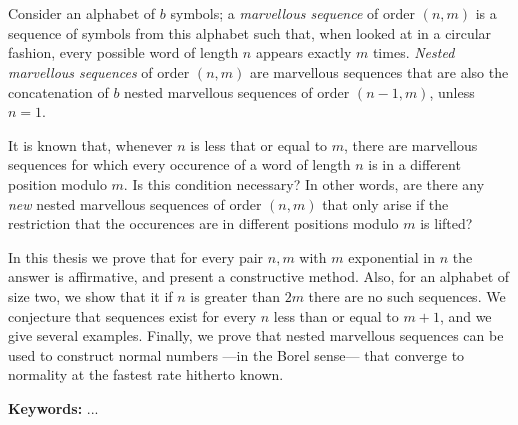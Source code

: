 \chapter*{\runtitle}

Consider an alphabet of $b$ symbols; a \emph{marvellous sequence} of
order $(n,m)$ is a sequence of symbols from this alphabet such that,
when looked at in a circular fashion, every possible word of length $n$ appears
exactly $m$ times.
\emph{Nested marvellous sequences} of order $(n,m)$ are marvellous
sequences that are also the concatenation of $b$ nested
marvellous sequences of order $(n-1,m)$, unless $n = 1$.

It is known that, whenever $n$ is less that or equal to $m$, there are marvellous
sequences for which every occurence of a word of length $n$ is in a different
position modulo $m$. Is this condition necessary? In other words,
are there any \emph{new} nested marvellous sequences of order $(n,m)$ that only
arise if the restriction that the occurences are in different positions modulo
$m$ is lifted?

In this thesis we prove that for every pair $n,m$ with $m$ exponential in $n$
the answer is affirmative, and present a constructive method.
Also, for an alphabet of size two, we show that it if $n$ is greater than $2m$
there are no such sequences.
We conjecture that sequences exist for every $n$ less than or equal to $m + 1$,
and we give several examples.
Finally, we prove that nested marvellous sequences can be used to construct
normal numbers ---in the Borel sense--- that converge to normality at the
fastest rate hitherto known.

\bigskip

\noindent\textbf{Keywords:} ...
